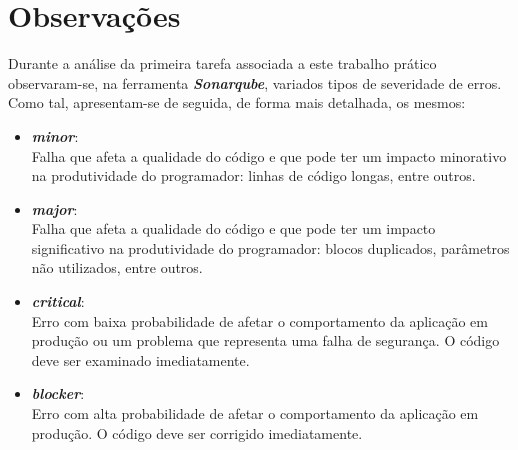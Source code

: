 \documentclass[a4paper]{report}
\begin{document}
\appendix
\chapter{Observações}
Durante a análise da primeira tarefa associada a este trabalho prático observaram-se, na ferramenta \textit{\textbf{Sonarqube}}, variados tipos de severidade de erros. Como tal, apresentam-se de seguida, de forma mais detalhada, os mesmos:
\begin{itemize}
    \item \textbf{\textit{minor}}:
    \\ Falha que afeta a qualidade do código e que pode ter um impacto minorativo na produtividade do programador: linhas de código longas, entre outros.
    \item \textbf{\textit{major}}:
    \\ Falha que afeta a qualidade do código e que pode ter um impacto significativo na produtividade do programador: blocos duplicados, parâmetros não utilizados, entre outros.
    \item \textbf{\textit{critical}}:
    \\ Erro com baixa probabilidade de afetar o comportamento da aplicação em produção ou um problema que representa uma falha de segurança. O código deve ser examinado imediatamente.
    \item \textbf{\textit{blocker}}:
    \\ Erro com alta probabilidade de afetar o comportamento da aplicação em produção. O código deve ser corrigido imediatamente.
\end{itemize}
\end{document}
